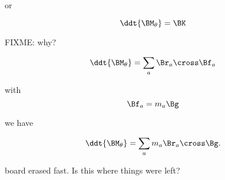 or

\begin{equation}\label{eqn:motionOfFreeTop:n}
\ddt{\BM_\theta} = \BK
\end{equation}

FIXME: why?

\begin{equation}\label{eqn:motionOfFreeTop:n}
\ddt{\BM_\theta} = \sum_a \Br_a \cross \Bf_a
\end{equation}

with
\begin{equation}\label{eqn:motionOfFreeTop:n}
\Bf_a = m_a \Bg
\end{equation}

we have

\begin{equation}\label{eqn:motionOfFreeTop:n}
\ddt{\BM_\theta} = \sum_a m_a \Br_a \cross \Bg.
\end{equation}

board erased fast.  Is this where things were left?

\EndNoBibArticle
